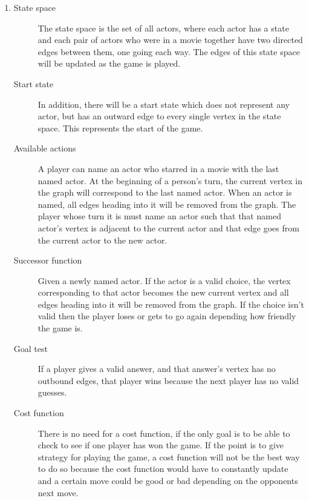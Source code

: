 \documentclass[11pt]{amsart}
\begin{document}
\begin{enumerate}
\begin{description}
\end{description}

\item

\begin{description}

    \item[State space] The state space is the set of all actors, where each actor has a
    state and each pair of actors who were in a movie together have two directed edges between them,
    one going each way.  The edges of this state space will be updated as the game is played.

    \item[Start state] In addition, there will be a start state which does not represent
    any actor, but has an outward edge to every single vertex in the state space.  This represents
    the start of the game.

    \item[Available actions] A player can name an actor who starred in a movie with the
    last named actor.  At the beginning of a person's turn, the current vertex in the graph will
    correspond to the last named actor.  When an actor is named, all edges heading into it will be
    removed from the graph. The player whose turn it is must name an actor such that that named
    actor's vertex is adjacent to the current actor and that edge goes from the current actor to the
    new actor.

    \item[Successor function] Given a newly named actor.  If the actor is a valid choice,
    the vertex corresponding to that actor becomes the new current vertex and all edges heading into
    it will be removed from the graph.  If the choice isn't valid then the player loses or gets to
    go again depending how friendly the game is.  

    \item[Goal test] If a player gives a valid answer, and that answer's vertex has no
    outbound edges, that player wins because the next player has no valid guesses.

    \item[Cost function] There is no need for a cost function, if the only goal is to be
    able to check to see if one player has won the game.  If the point is to give strategy for
    playing the game, a cost function will not be the best way to do so because the cost function
    would have to constantly update and a certain move could be good or bad depending on the
    opponents next move.


\end{description}
\end{enumerate}
\end{document}
